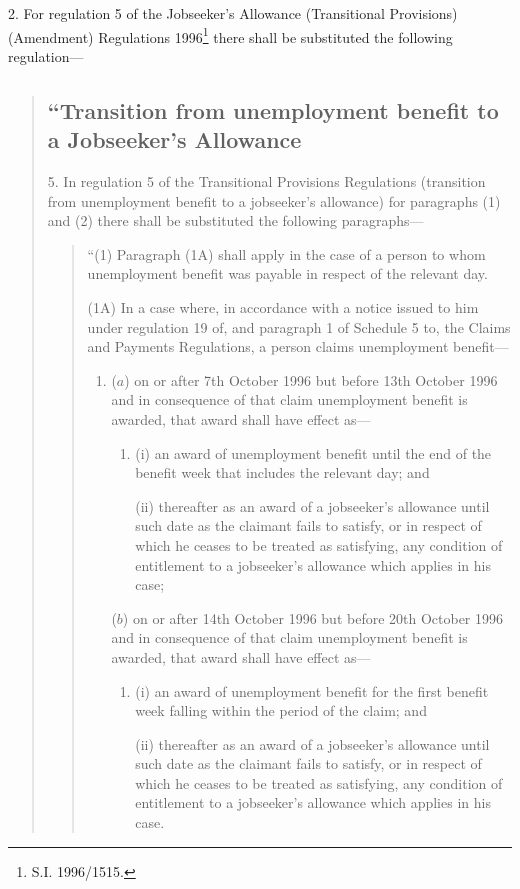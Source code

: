 \documentclass[a4paper]{article}
\begin{document}
2.  For regulation 5 of the Jobseeker’s Allowance (Transitional Provisions) (Amendment) Regulations 1996\footnote{\frenchspacing S.I. 1996/1515.} there shall be substituted the following regulation—
\begin{quotation}
\subsection*{\sloppy “Transition from unemployment benefit to a Jobseeker’s Allowance}

5.  In regulation 5 of the Transitional Provisions Regulations (transition from unemployment benefit to a jobseeker’s allowance) for paragraphs (1) and (2) there shall be substituted the following paragraphs—
\begin{quotation}
“(1) Paragraph (1A) shall apply in the case of a person to whom unemployment benefit was payable in respect of the relevant day.

(1A) In a case where, in accordance with a notice issued to him under regulation 19 of, and paragraph 1 of Schedule 5 to, the Claims and Payments Regulations, a person claims unemployment benefit—
\begin{enumerate}\item[]
($a$) on or after 7th October 1996 but before 13th October 1996 and in consequence of that claim unemployment benefit is awarded, that award shall have effect as—
\begin{enumerate}\item[]
(i) an award of unemployment benefit until the end of the benefit week that includes the relevant day; and

(ii) thereafter as an award of a jobseeker’s allowance until such date as the claimant fails to satisfy, or in respect of which he ceases to be treated as satisfying, any condition of entitlement to a jobseeker’s allowance which applies in his case;
\end{enumerate}

($b$) on or after 14th October 1996 but before 20th October 1996 and in consequence of that claim unemployment benefit is awarded, that award shall have effect as—
\begin{enumerate}\item[]
(i) an award of unemployment benefit for the first benefit week falling within the period of the claim; and

(ii) thereafter as an award of a jobseeker’s allowance until such date as the claimant fails to satisfy, or in respect of which he ceases to be treated as satisfying, any condition of entitlement to a jobseeker’s allowance which applies in his case.
\end{enumerate}
\end{enumerate}


\end{quotation}
\end{quotation}
\end{document}
